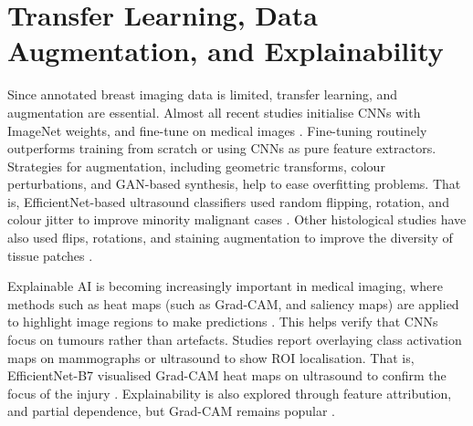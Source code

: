 \documentclass[../main]{subfiles}
\begin{document}
\section{Transfer Learning, Data Augmentation, and Explainability}
\label{sec:transfer-learning}
Since annotated breast imaging data is limited, transfer learning, and augmentation are essential. Almost all recent studies initialise CNNs with ImageNet weights, and fine-tune on medical images \autocite{srikantamurthy2023classification}. Fine-tuning routinely outperforms training from scratch or using CNNs as pure feature extractors. Strategies for augmentation, including geometric transforms, colour perturbations, and GAN-based synthesis, help to ease overfitting problems. That is, EfficientNet-based ultrasound classifiers used random flipping, rotation, and colour jitter to improve minority malignant cases \autocite{latha2024revolutionizing}. Other histological studies have also used flips, rotations, and staining augmentation to improve the diversity of tissue patches \autocite{srikantamurthy2023classification}.

Explainable AI is becoming increasingly important in medical imaging, where methods such as heat maps (such as Grad-CAM, and saliency maps) are applied to highlight image regions to make predictions \autocite{latha2024revolutionizing} \autocite{kaba2024explainable}. This helps verify that CNNs focus on tumours rather than artefacts. Studies report overlaying class activation maps on mammographs or ultrasound to show ROI localisation. That is, EfficientNet-B7 visualised Grad-CAM heat maps on ultrasound to confirm the focus of the injury \autocite{latha2024revolutionizing}. Explainability is also explored through feature attribution, and partial dependence, but Grad-CAM remains popular \autocite{latha2024revolutionizing} \autocite{kaba2024explainable}.
\end{document}
